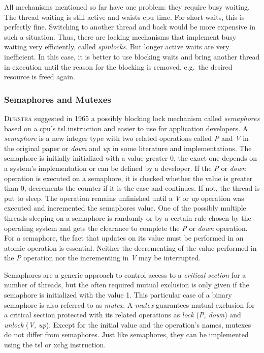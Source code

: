 All mechanisms mentioned so far have one problem: they require busy waiting.
The thread waiting is still active and waists \ac{cpu} time.
For short waits, this is perfectly fine.  
Switching to another thread and back would be more expensive in such a situation\cite{glatz2015betriebssysteme}. 
Thus, there are locking mechanisms that implement busy waiting very efficiently, called \textit{spinlocks}\cite{tanenbaum-modern-operating-systems}.
But longer active waits are very inefficient.
In this case, it is better to use blocking waits and bring another thread in execution until the reason for the blocking is removed, e.g.\ the desired resource is freed again.

\subsubsection*{Semaphores and Mutexes}
\textsc{Dijkstra} suggested in 1965 a possibly blocking lock mechanism called \textit{semaphores} based on a \ac{cpu}'s \ac{tsl} instruction and easier to use for application developers.
A \textit{semaphore} is a new integer type with two related operations called \textit{P} and \textit{V} in the original paper or \textit{down} and \textit{up} in some literature and implementations\cite{glatz2015betriebssysteme}.
The semaphore is initially initialized with a value greater 0, the exact one depends on a system's implementation or can be defined by a developer.
If the \textit{P} or \textit{down} operation is executed on a semaphore, it is checked whether the value is greater than 0, decrements the counter if it is the case and continues. 
If not, the thread is put to sleep.
The operation remains unfinished until a \textit{V} or \textit{up} operation was executed and incremented the semaphores value.
One of the possibly multiple threads sleeping on a semaphore is randomly or by a certain rule chosen by the operating system and gets the clearance to complete the \textit{P} or \textit{down} operation\cite{tanenbaum-modern-operating-systems}.
For a semaphore, the fact that updates on its value must be performed in an atomic operation is essential\cite{silberschatz2009operating}.
Neither the decrementing of the value performed in the \textit{P} operation nor the incrementing in \textit{V} may be interrupted.

Semaphores are a generic approach to control access to a \textit{critical section} for a number of threads, but the often required mutual exclusion is only given if the semaphore is initialized with the value 1.
This particular case of a binary semaphore is also referred to as \textit{mutex}.
A \textit{mutex} guarantees mutual exclusion for a critical section protected with its related operations as \textit{lock} (\textit{P, down}) and \textit{unlock} (\textit{V, up})\cite{tanenbaum-modern-operating-systems}.
Except for the initial value and the operation's names, mutexes do not differ from semaphores.
Just like semaphores, they can be implemented using the \ac{tsl} or \ac{xchg} instruction.

